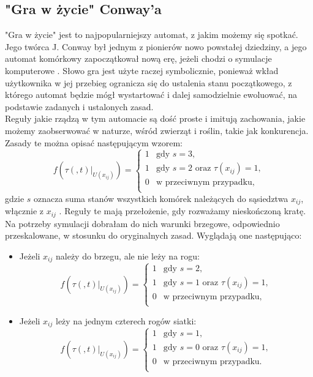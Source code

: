 \documentclass[a4paper,12pt]{article}
\begin{document}
\subsection{"Gra w życie" Conway'a}

"Gra w życie" jest to najpopularniejszy automat, z jakim możemy się spotkać. Jego twórca J. Conway był jednym z pionierów nowo powstałej dziedziny, a jego automat komórkowy zapoczątkował  nową erę, jeżeli chodzi o symulacje komputerowe \cite{hill}. Słowo gra jest użyte raczej symbolicznie, ponieważ wkład użytkownika w jej przebieg ogranicza się do ustalenia stanu początkowego, z którego automat będzie mógł wystartować i dalej samodzielnie ewoluować, na podstawie zadanych i ustalonych zasad. \\
Reguły jakie rządzą w tym automacie są dość proste i imitują zachowania, jakie możemy zaobserwować w naturze, wśród zwierząt i roślin, takie jak konkurencja. Zasady te można opisać następującym wzorem:\\
$$
f(\tau(,t)|_{U(x_{ij})})= \left\{ \begin{array}{ll}
1 & \textrm{gdy $s=3,$}\\
1 & \textrm{gdy $s=2$ oraz $\tau(x_{ij})=1$},\\
0 & \textrm{w przeciwnym przypadku,}\\
\end{array} \right.
$$
gdzie $s$ oznacza suma stanów wszystkich komórek należących do sąsiedztwa $x_{ij}$, włącznie z ${x_{ij}}$ \cite{hill}. Reguły te mają przełożenie, gdy rozważamy nieskończoną kratę. 
Na potrzeby symulacji dobrałam do nich warunki brzegowe, odpowiednio przeskalowane, w stosunku do oryginalnych zasad. Wyglądają one następująco:
\begin{itemize}
    \item Jeżeli $x_{ij}$ należy do brzegu, ale nie leży na rogu:
    $$
f(\tau(,t)|_{U(x_{ij})})= \left\{ \begin{array}{ll}
1 & \textrm{gdy $s=2,$}\\
1 & \textrm{gdy $s=1$ oraz $\tau(x_{ij})=1$},\\
0 & \textrm{w przeciwnym przypadku,}\\
\end{array} \right.
$$
\item Jeżeli $x_{ij}$ leży na jednym  czterech rogów siatki:
$$
f(\tau(,t)|_{U(x_{ij})})= \left\{ \begin{array}{ll}
1 & \textrm{gdy $s=1,$}\\
1 & \textrm{gdy $s=0$ oraz $\tau(x_{ij})=1$},\\
0 & \textrm{w przeciwnym przypadku.}\\
\end{array} \right.
$$
\end{itemize}
\end{document}
